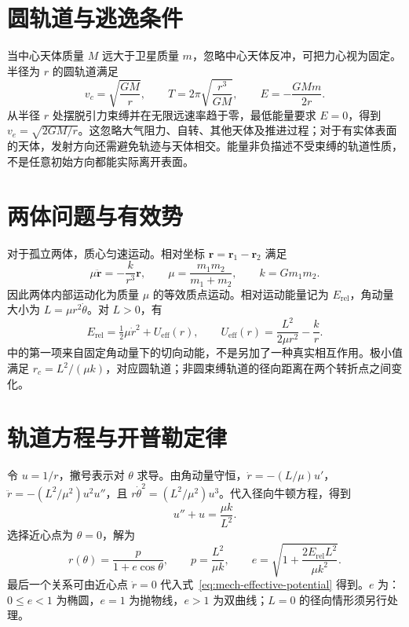 \documentclass[UTF8,12pt,a4paper,fontset=fandol]{ctexbook}
\begin{document}
\section{圆轨道与逃逸条件}
当中心天体质量 $M$ 远大于卫星质量 $m$，忽略中心天体反冲，可把力心视为固定。半径为 $r$ 的圆轨道满足
\[
 v_c=\sqrt{\frac{GM}{r}},\qquad
 T=2\pi\sqrt{\frac{r^3}{GM}},\qquad E=-\frac{GMm}{2r}.
\]
从半径 $r$ 处摆脱引力束缚并在无限远速率趋于零，最低能量要求 $E=0$，得到 $v_e=\sqrt{2GM/r}$。这忽略大气阻力、自转、其他天体及推进过程；对于有实体表面的天体，发射方向还需避免轨迹与天体相交。能量非负描述不受束缚的轨道性质，不是任意初始方向都能实际离开表面。

\section{两体问题与有效势}
对于孤立两体，质心匀速运动。相对坐标 $\mathbf r=\mathbf r_1-\mathbf r_2$ 满足
\[
 \mu\ddot{\mathbf r}=-\frac{k}{r^3}\mathbf r,\qquad
 \mu=\frac{m_1m_2}{m_1+m_2},\qquad k=Gm_1m_2.
\]
因此两体内部运动化为质量 $\mu$ 的等效质点运动。相对运动能量记为 $E_{\mathrm{rel}}$，角动量大小为 $L=\mu r^2\dot\theta$。对 $L>0$，有
\begin{equation}
 E_{\mathrm{rel}}=\tfrac12\mu\dot r^2+U_{\mathrm{eff}}(r),\qquad
 U_{\mathrm{eff}}(r)=\frac{L^2}{2\mu r^2}-\frac{k}{r}.
 \label{eq:mech-effective-potential}
\end{equation}
中的第一项来自固定角动量下的切向动能，不是另加了一种真实相互作用。极小值满足 $r_c=L^2/(\mu k)$，对应圆轨道；非圆束缚轨道的径向距离在两个转折点之间变化。

\section{轨道方程与开普勒定律}
令 $u=1/r$，撇号表示对 $\theta$ 求导。由角动量守恒，$\dot r=-(L/\mu)u'$，$\ddot r=-(L^2/\mu^2)u^2u''$，且 $r\dot\theta^2=(L^2/\mu^2)u^3$。代入径向牛顿方程，得到
\[
 u''+u=\frac{\mu k}{L^2}.
\]
选择近心点为 $\theta=0$，解为
\begin{equation}
 r(\theta)=\frac{p}{1+e\cos\theta},\qquad
 p=\frac{L^2}{\mu k},\qquad
 e=\sqrt{1+\frac{2E_{\mathrm{rel}}L^2}{\mu k^2}}.
 \label{eq:mech-orbit}
\end{equation}
最后一个关系可由近心点 $\dot r=0$ 代入式~\eqref{eq:mech-effective-potential} 得到。$e$ 为：$0\le e<1$ 为椭圆，$e=1$ 为抛物线，$e>1$ 为双曲线；$L=0$ 的径向情形须另行处理。
\end{document}
